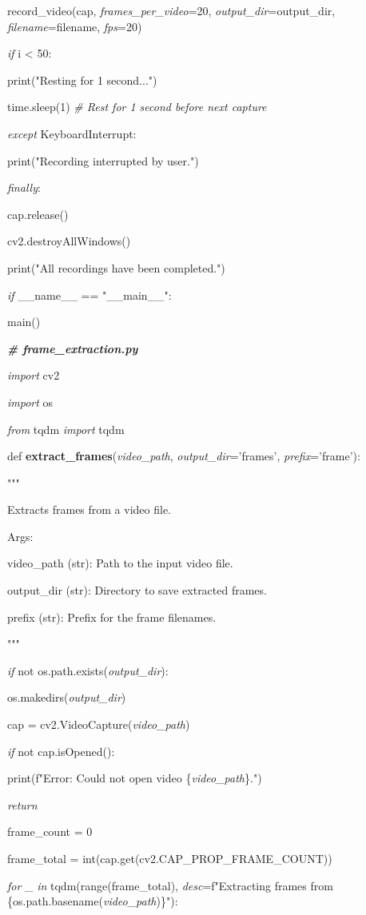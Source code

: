 \documentclass[
]{article}
\begin{document}
record\_video(cap, \emph{frames\_per\_video}=20, \emph{output\_dir}=output\_dir, \emph{filename}=filename, \emph{fps}=20)

\emph{if} i \textless{} 50:

print("Resting for 1 second...")

time.sleep(1) \emph{\# Rest for 1 second before next capture}

\emph{except} KeyboardInterrupt:

print("Recording interrupted by user.")

\emph{finally}:

cap.release()

cv2.destroyAllWindows()

print("All recordings have been completed.")

\emph{if} \_\_name\_\_ == "\_\_main\_\_":

main()

\emph{\textbf{\# frame\_extraction.py}}

\emph{import} cv2

\emph{import} os

\emph{from} tqdm \emph{import} tqdm

def \textbf{extract\_frames}(\emph{video\_path}, \emph{output\_dir}='frames', \emph{prefix}='frame'):

"""

Extracts frames from a video file.

Args:

video\_path (str): Path to the input video file.

output\_dir (str): Directory to save extracted frames.

prefix (str): Prefix for the frame filenames.

"""

\emph{if} not os.path.exists(\emph{output\_dir}):

os.makedirs(\emph{output\_dir})

cap = cv2.VideoCapture(\emph{video\_path})

\emph{if} not cap.isOpened():

print(f"Error: Could not open video \{\emph{video\_path}\}.")

\emph{return}

frame\_count = 0

frame\_total = int(cap.get(cv2.CAP\_PROP\_FRAME\_COUNT))

\emph{for} \_ \emph{in} tqdm(range(frame\_total), \emph{desc}=f"Extracting frames from \{os.path.basename(\emph{video\_path})\}"):
\end{document}
